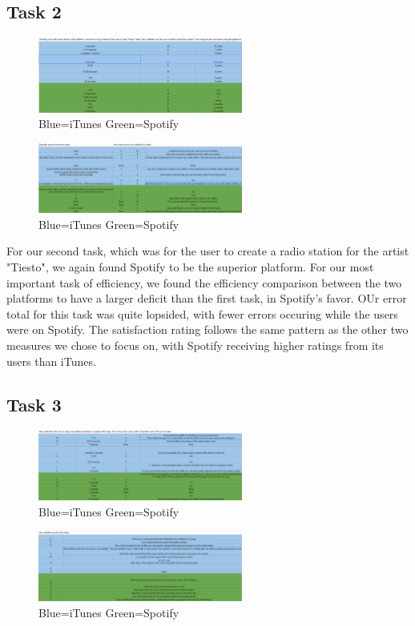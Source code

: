 \documentclass[a4paper]{article}
\begin{document}
\subsection{Task 2}

\begin{figure}[H]
\centering
\includegraphics[width=0.6\textwidth]{task2_1.PNG}
\caption{\label{task:task2.1}Blue=iTunes  Green=Spotify}
\end{figure}
\begin{figure}[H]
\centering
\includegraphics[width=0.6\textwidth]{task2_2.PNG}
\caption{\label{task:task2.2}Blue=iTunes  Green=Spotify}
\end{figure}

For our second task, which was for the user to create a radio station for the artist "Tiesto", we again found Spotify to be the superior platform. For our most important task of efficiency, we found the efficiency comparison between the two platforms to have a larger deficit than the first task, in Spotify's favor. OUr error total for this task was quite lopsided, with fewer errors occuring while the users were on Spotify. The satisfaction rating follows the same pattern as the other two measures we chose to focus on, with Spotify receiving higher ratings from its users than iTunes.


\subsection{Task 3}

\begin{figure}[H]
\centering
\includegraphics[width=0.6\textwidth]{task3_1.PNG}
\caption{\label{task:task3.1}Blue=iTunes  Green=Spotify}
\end{figure}
\begin{figure}[H]
\centering
\includegraphics[width=0.6\textwidth]{task3_2.PNG}
\caption{\label{task:task3.2}Blue=iTunes  Green=Spotify}
\end{figure}
\end{document}
